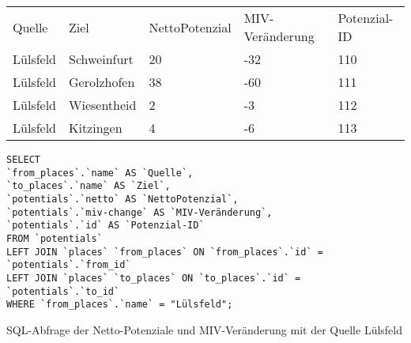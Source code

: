 \begin{tabular}{ l  l  l  l  l }
Quelle & Ziel & NettoPotenzial & MIV-Veränderung & Potenzial-ID\\ 
Lülsfeld & Schweinfurt & 20 & -32 & 110\\ 
Lülsfeld & Gerolzhofen & 38 & -60 & 111\\ 
Lülsfeld & Wiesentheid & 2 & -3 & 112\\ 
Lülsfeld & Kitzingen & 4 & -6 & 113\\ 
\end{tabular}
\newline
\newline
\begin{listing}[htbp]
\begin{verbatim}
SELECT
`from_places`.`name` AS `Quelle`, 
`to_places`.`name` AS `Ziel`, 
`potentials`.`netto` AS `NettoPotenzial`, 
`potentials`.`miv-change` AS `MIV-Veränderung`, 
`potentials`.`id` AS `Potenzial-ID`
FROM `potentials`
LEFT JOIN `places` `from_places` ON `from_places`.`id` = `potentials`.`from_id`
LEFT JOIN `places` `to_places` ON `to_places`.`id` = `potentials`.`to_id`
WHERE `from_places`.`name` = "Lülsfeld";
\end{verbatim}
\caption{SQL-Abfrage der Netto-Potenziale und MIV-Veränderung mit der Quelle Lülsfeld}\label{lst-fz-luelsfeld}
\end{listing}